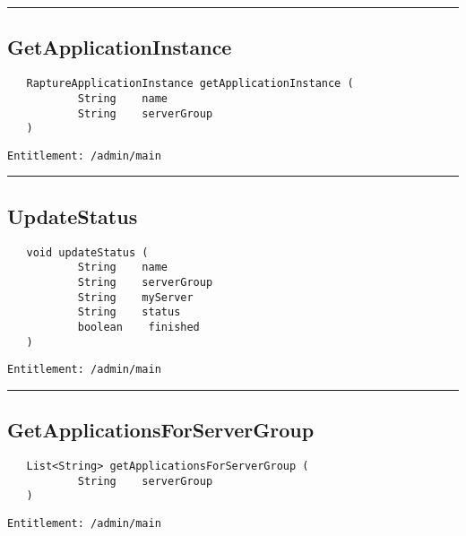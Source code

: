 \rule{12cm}{2pt}
\subsection{GetApplicationInstance}
\label{Api:GetApplicationInstance}
\begin{verbatim}
   RaptureApplicationInstance getApplicationInstance (
           String    name
           String    serverGroup
   )
\end{verbatim}
\begin{Verbatim}[fontsize=\small, formatcom=\color{Maroon}]
  Entitlement: /admin/main
\end{Verbatim}



\rule{12cm}{2pt}
\subsection{UpdateStatus}
\label{Api:UpdateStatus}
\begin{verbatim}
   void updateStatus (
           String    name
           String    serverGroup
           String    myServer
           String    status
           boolean    finished
   )
\end{verbatim}
\begin{Verbatim}[fontsize=\small, formatcom=\color{Maroon}]
  Entitlement: /admin/main
\end{Verbatim}



\rule{12cm}{2pt}
\subsection{GetApplicationsForServerGroup}
\label{Api:GetApplicationsForServerGroup}
\begin{verbatim}
   List<String> getApplicationsForServerGroup (
           String    serverGroup
   )
\end{verbatim}
\begin{Verbatim}[fontsize=\small, formatcom=\color{Maroon}]
  Entitlement: /admin/main
\end{Verbatim}



